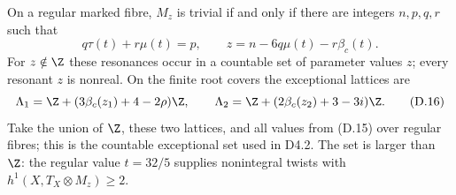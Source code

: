 \begin{proposition}\label{inv:D4.3}
On a regular marked fibre, $M_z$ is trivial if and only if there are
integers $n,p,q,r$ such that
\[
 q\tau(t)+r\mu(t)=p,\qquad
 z=n-6q\mu(t)-r\beta_c(t).                             \tag{D.15}
\]
For $z\notin\Z$ these resonances occur in a countable set of parameter
values $z$; every resonant $z$ is nonreal. On the finite root covers
the exceptional lattices are
\[
 \Lambda_1=\Z+(3\beta_c(z_1)+4-2\rho)\Z,\qquad
 \Lambda_2=\Z+(2\beta_c(z_2)+3-3i)\Z.                  \tag{D.16}
\]
Take the union of $\Z$, these two lattices, and all values from (D.15)
over regular fibres; this is the countable exceptional set used in
D4.2. The set is larger than $\Z$: the regular value $t=32/5$
supplies nonintegral twists with $h^1(X,T_X\otimes M_z)\ge2$.
\end{proposition}
